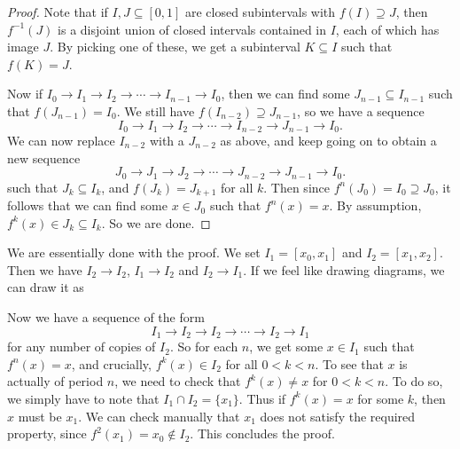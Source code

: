 \documentclass{shortart}
\theoremstyle{definition}
\begin{document}
\begin{proof}
  Note that if $I, J \subseteq [0, 1]$ are closed subintervals with $f(I) \supseteq J$, then $f^{-1}(J)$ is a disjoint union of closed intervals contained in $I$, each of which has image $J$. By picking one of these, we get a subinterval $K \subseteq I$ such that $f(K) = J$.

  Now if $I_0 \to I_1 \to I_2 \to \cdots \to I_{n - 1} \to I_0$, then we can find some $J_{n - 1} \subseteq I_{n-1}$ such that $f(J_{n-1}) = I_0$. We still have $f(I_{n-2}) \supseteq J_{n-1}$, so we have a sequence
  \[
    I_0 \to I_1 \to I_2 \to \cdots \to I_{n-2} \to J_{n-1} \to I_0.
  \]
  We can now replace $I_{n-2}$ with a $J_{n-2}$ as above, and keep going on to obtain a new sequence
  \[
    J_0 \to J_1 \to J_2 \to \cdots \to J_{n-2} \to J_{n-1} \to I_0.
  \]
  such that $J_k \subseteq I_k$, and $f(J_k) = J_{k+1}$ for all $k$. Then since $f^n(J_0) = I_0 \supseteq J_0$, it follows that we can find some $x \in J_0$ such that $f^n(x) = x$. By assumption, $f^k(x) \in J_k \subseteq I_k$. So we are done.
\end{proof}

We are essentially done with the proof. We set $I_1 = [x_0, x_1]$ and $I_2 = [x_1, x_2]$. Then we have $I_2 \to I_2$, $I_1 \to I_2$ and $I_2 \to I_1$. If we feel like drawing diagrams, we can draw it as

\begin{center}
\end{center}

Now we have a sequence of the form
\[
  I_1 \to I_2 \to I_2 \to \cdots \to I_2 \to I_1
\]
for any number of copies of $I_2$. So for each $n$, we get some $x \in I_1$ such that $f^n(x) = x$, and crucially, $f^k(x) \in I_2$ for all $0 < k < n$. To see that $x$ is actually of period $n$, we need to check that $f^k(x) \not= x$ for $0 < k < n$. To do so, we simply have to note that $I_1 \cap I_2  = \{x_1\}$. Thus if $f^k(x) = x$ for some $k$, then $x$ must be $x_1$. We can check manually that $x_1$ does not satisfy the required property, since $f^2(x_1) = x_0 \not\in I_2$. This concludes the proof.
\end{document}
